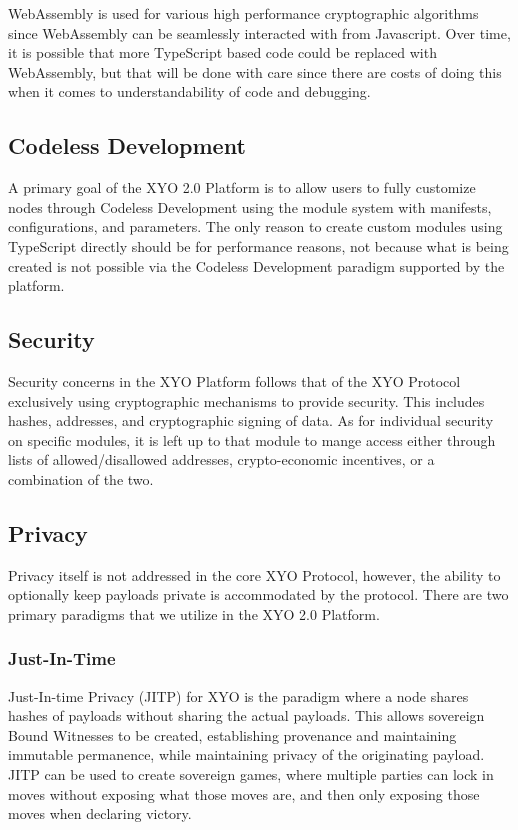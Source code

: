 \documentclass{article}
\begin{document}
WebAssembly is used for various high performance cryptographic algorithms since WebAssembly can be seamlessly interacted with from Javascript.  Over time, it is possible that more TypeScript based code could be replaced with WebAssembly, but that will be done with care since there are costs of doing this when it comes to understandability of code and debugging.

\subsection {Codeless Development}
A primary goal of the XYO 2.0 Platform is to allow users to fully customize nodes through Codeless Development using the module system with manifests, configurations, and parameters. The only reason to create custom modules using TypeScript directly should be for performance reasons, not because what is being created is not possible via the Codeless Development paradigm supported by the platform.

\subsection {Security}
Security concerns in the XYO Platform follows that of the XYO Protocol exclusively using cryptographic mechanisms to provide security.  This includes hashes, addresses, and cryptographic signing of data.  As for individual security on specific modules, it is left up to that module to mange access either through lists of allowed/disallowed addresses, crypto-economic incentives, or a combination of the two.

\subsection {Privacy}
Privacy itself is not addressed in the core XYO Protocol, however, the ability to optionally keep payloads private is accommodated by the protocol.  There are two primary paradigms that we utilize in the XYO 2.0 Platform.

\subsubsection{Just-In-Time}
Just-In-time Privacy (JITP) for XYO is the paradigm where a node shares hashes of payloads without sharing the actual payloads. This allows sovereign Bound Witnesses to be created, establishing provenance and maintaining immutable permanence, while maintaining privacy of the originating payload.  JITP can be used to create sovereign games, where multiple parties can lock in moves without exposing what those moves are, and then only exposing those moves when declaring victory.
\end{document}
